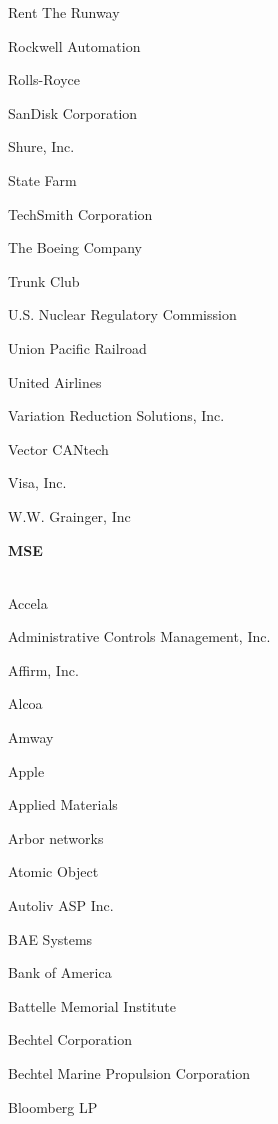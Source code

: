 \documentclass[twoside]{article}
\begin{document}
\begin{center}
\begin{multicols}{5}
\begin{FlushLeft}
\begin{compactitem}
\item Rent The Runway
\item Rockwell Automation
\item Rolls-Royce
\item SanDisk Corporation
\item Shure, Inc.
\item State Farm
\item TechSmith Corporation
\item The Boeing Company
\item Trunk Club
\item U.S. Nuclear Regulatory Commission
\item Union Pacific Railroad
\item United Airlines
\item Variation Reduction Solutions, Inc.
\item Vector CANtech
\item Visa, Inc.
\item W.W. Grainger, Inc
\end{compactitem}
        \end{FlushLeft}
        \vspace{1em}
        {\fontsize{14}{16}\selectfont \bf MSE}\\
        \vspace{-1em}
        ~\hrulefill~
        \vspace{-.9em}
        \begin{FlushLeft}
        \begin{compactitem}
        \item Accela
\item Administrative Controls Management, Inc.
\item Affirm, Inc.
\item Alcoa
\item Amway
\item Apple
\item Applied Materials
\item Arbor networks
\item Atomic Object
\item Autoliv ASP Inc.
\item BAE Systems
\item Bank of America
\item Battelle Memorial Institute
\item Bechtel Corporation
\item Bechtel Marine Propulsion Corporation
\item Bloomberg LP

\end{compactitem}
\end{FlushLeft}
\end{multicols}
\end{center}
\end{document}
